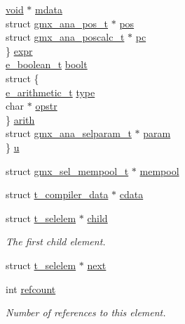 \begin{DoxyCompactItemize}
\begin{tabbing}
\>\>\hyperlink{nbnxn__kernel__simd__4xn__outer_8h_a8dc3f4a797ed992dff49d2fa3477eee8}{void} $\ast$ \hyperlink{structt__selelem_a4d527b4b7880fc0555a73d218fe8c7e7}{mdata}\\
\>\>struct \hyperlink{structgmx__ana__pos__t}{gmx\_ana\_pos\_t} $\ast$ \hyperlink{structt__selelem_af589106f31e3e1cf9c7efe106270747c}{pos}\\
\>\>struct \hyperlink{structgmx__ana__poscalc__t}{gmx\_ana\_poscalc\_t} $\ast$ \hyperlink{structt__selelem_a2ee93956d30023a0317ce9fd6130cfca}{pc}\\
\>\} \hyperlink{structt__selelem_aae043fe67c7daa99ee1b4cb7b58cd1f0}{expr}\\
\>\hyperlink{selelem_8h_ad24657d98854e03c3d6c46c37022a446}{e\_boolean\_t} \hyperlink{structt__selelem_a30d99a688718472ac787891e61e6d1ec}{boolt}\\
\>struct \{\\
\>\>\hyperlink{selelem_8h_a0c506fcb4663a5ee8b9340527b7178d7}{e\_arithmetic\_t} \hyperlink{structt__selelem_a04adc54787ac557b848ca891ca916f6c}{type}\\
\>\>char $\ast$ \hyperlink{structt__selelem_afca0d677a7b5ae84a571a4e344d37456}{opstr}\\
\>\} \hyperlink{structt__selelem_aa2647b18eb882e4fbc40169c6b7e1a8d}{arith}\\
\>struct \hyperlink{structgmx__ana__selparam__t}{gmx\_ana\_selparam\_t} $\ast$ \hyperlink{structt__selelem_aa5e5c027ad2dbb7f02948b797e79b226}{param}\\
\} \hyperlink{structt__selelem_a0d2e2459aa975806044860b15bd88187}{u}\\

\end{tabbing}\item 
struct \hyperlink{structgmx__sel__mempool__t}{gmx\-\_\-sel\-\_\-mempool\-\_\-t} $\ast$ \hyperlink{structt__selelem_a881bbe9a44c4643401cde02f6bca162e}{mempool}
\item 
struct \hyperlink{structt__compiler__data}{t\-\_\-compiler\-\_\-data} $\ast$ \hyperlink{structt__selelem_ad9857dc1c7385a2927b52b7033ec0768}{cdata}
\item 
struct \hyperlink{structt__selelem}{t\-\_\-selelem} $\ast$ \hyperlink{structt__selelem_aead0ea49e1e5080a07d7d95694e17f5f}{child}
\begin{DoxyCompactList}\small\item\em \-The first child element. \end{DoxyCompactList}\item 
struct \hyperlink{structt__selelem}{t\-\_\-selelem} $\ast$ \hyperlink{structt__selelem_aa083abd2a03676e7eab479081390f600}{next}
\item 
int \hyperlink{structt__selelem_a6082e97ed5fd779a65d0b8d04c12c5bb}{refcount}
\begin{DoxyCompactList}\small\item\em \-Number of references to this element. \end{DoxyCompactList}\end{DoxyCompactItemize}


